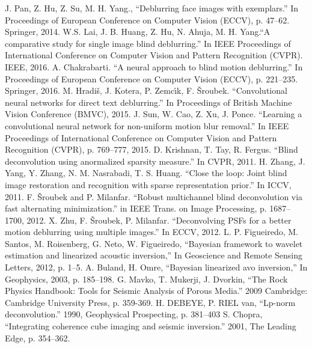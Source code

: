 \documentclass[conference,compsoc]{IEEEtran}
\begin{document}
\begin{thebibliography}{1}
		J. Pan, Z. Hu, Z. Su, M. H. Yang., ``Deblurring face images with exemplars.'' In Proceedings of European Conference on Computer Vision (ECCV), p. 47–62. Springer, 2014.
		W.S. Lai, J. B. Huang, Z. Hu, N. Ahuja, M. H. Yang.``A comparative study for single image blind deblurring.'' In IEEE Proceedings of International Conference on Computer Vision and Pattern Recognition (CVPR). IEEE, 2016.
	A. Chakrabarti. ``A neural approach to blind motion deblurring.'' In Proceedings of European Conference on Computer Vision (ECCV), p. 221–235. Springer, 2016.
		M. Hradiš, J. Kotera, P. Zemcı́k, F. Šroubek. ``Convolutional neural networks for direct text deblurring.'' In Proceedings of British Machine Vision Conference (BMVC), 2015.
		J. Sun, W. Cao, Z. Xu, J. Ponce. ``Learning a convolutional neural network for non-uniform motion blur removal.'' In IEEE Proceedings of International Conference on Computer Vision and Pattern Recognition (CVPR), p. 769–777, 2015.
		D. Krishnan, T. Tay, R. Fergus. ``Blind deconvolution using anormalized sparsity measure.'' In CVPR, 2011.
		H. Zhang, J. Yang, Y. Zhang, N. M. Nasrabadi, T. S. Huang. ``Close the loop: Joint blind image restoration and recognition with sparse representation prior.'' In ICCV, 2011. 
		F. Šroubek and P. Milanfar. ``Robust multichannel blind deconvolution via fast alternating minimization.'' in IEEE Trans. on Image Processing, p. 1687–1700, 2012.
		X. Zhu, F. Šroubek, P. Milanfar. ``Deconvolving PSFs for a better motion deblurring using multiple images.'' In ECCV, 2012.
	L. P. Figueiredo, M. Santos, M. Roisenberg, G. Neto, W. Figueiredo, ``Bayesian framework to wavelet estimation and linearized acoustic inversion,'' In Geoscience and Remote Sensing Letters, 2012, p. 1–5.
		A. Buland,  H. Omre, ``Bayesian linearized avo inversion,'' In Geophysics, 2003, p. 185–198.
		G. Mavko, T. Mukerji, J. Dvorkin, ``The Rock Physics Handbook: Tools for Seismic Analysis of Porous Media.'' 2009 Cambridge: Cambridge University Press, p. 359-369.
		H. DEBEYE, P. RIEL van, ``Lp-norm deconvolution.'' 1990, Geophysical Prospecting, p. 381–403
		S. Chopra, ``Integrating coherence cube imaging and seismic inversion.'' 2001, The Leading Edge, p. 354–362.
\end{thebibliography}



\end{document}
